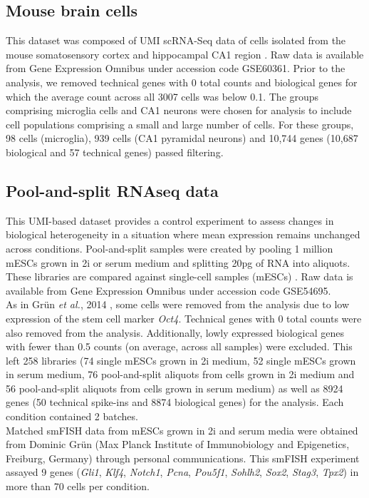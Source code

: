 \subsection{Mouse brain cells} \label{seq::data_micro}

This dataset was composed of UMI scRNA-Seq data of cells isolated from the mouse somatosensory cortex and hippocampal CA1 region \citep{Zeisel2015}. 
Raw data is available from Gene Expression Omnibus under accession code GSE60361. Prior to the analysis, we removed technical genes with 0 total counts and biological genes for which the average count across all 3007 cells was below 0.1. 
The groups comprising microglia cells and CA1 neurons were chosen for analysis to include cell populations comprising a small and large number of cells. 
For these groups, 98 cells (microglia), 939 cells (CA1 pyramidal neurons) and 10,744 genes (10,687 biological and 57 technical genes) passed filtering.

\subsection{Pool-and-split RNAseq data} \label{seq::data_PaS}

This UMI-based dataset provides a control experiment to assess changes in biological heterogeneity in a situation where mean expression remains unchanged across conditions. 
Pool-and-split samples were created by pooling 1 million mESCs grown in 2i or serum medium and splitting 20pg of RNA into aliquots. 
These libraries are compared against single-cell samples (mESCs) \citep{Grun2014}. 
Raw data is available from Gene Expression Omnibus under accession code GSE54695. \\

As in Gr\"un \emph{et al.}, 2014 \cite{Grun2014}, some cells were removed from the analysis due to low expression of the stem cell marker \textit{Oct4}. 
Technical genes with 0 total counts were also removed from the analysis. Additionally, lowly expressed biological genes with fewer than 0.5 counts (on average, across all samples) were excluded. 
This left 258 libraries (74 single mESCs grown in 2i medium, 52 single mESCs grown in serum medium, 76 pool-and-split aliquots from cells grown in 2i medium and 56 pool-and-split aliquots from cells grown in serum medium) as well as 8924 genes (50 technical spike-ins and 8874 biological genes) for the analysis. 
Each condition contained 2 batches.\\

Matched smFISH data from mESCs grown in 2i and serum media were obtained from Dominic Gr\"un (Max Planck Institute of Immunobiology and Epigenetics, Freiburg, Germany) through personal communications. This smFISH experiment assayed 9 genes (\textit{Gli1}, \textit{Klf4}, \textit{Notch1}, \textit{Pcna}, \textit{Pou5f1}, \textit{Sohlh2}, \textit{Sox2}, \textit{Stag3}, \textit{Tpx2}) in more than 70 cells per condition. %

